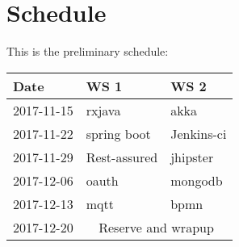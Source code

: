 \section*{Schedule}

This is the preliminary schedule:

\begin{center}
  \begin{tabular}{|l|l|l|}\hline
    \textbf{Date}& \textbf{WS 1}& \textbf{WS 2}\\\hline
    2017-11-15 & rxjava & akka\\\hline
    2017-11-22 & spring boot & Jenkins-ci\\\hline
    2017-11-29 & Rest-assured & jhipster\\\hline
    2017-12-06 & oauth & mongodb\\\hline
    2017-12-13 & mqtt & bpmn\\\hline
    2017-12-20 & \multicolumn{2}{c|}{Reserve and wrapup}\\\hline
  \end{tabular}
\end{center}

